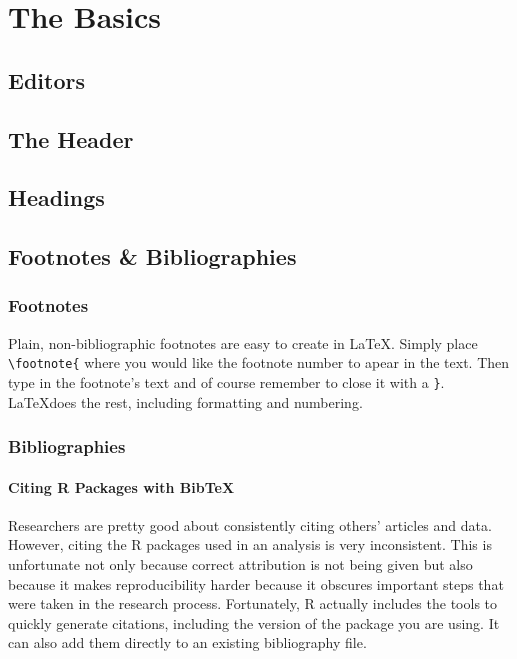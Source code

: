 \documentclass[ChapterTOCs,krantz1]{krantz}\usepackage{graphicx, color}
\begin{document}
\section{The Basics}

\subsection{Editors}

\subsection{The Header}

\subsection{Headings}

\subsection{Footnotes \& Bibliographies}

\subsubsection{Footnotes}

Plain, non-bibliographic footnotes are easy to create in \LaTeX. Simply place \texttt{\textbackslash{}footnote\{} where you would like the footnote number to apear in the text. Then type in the footnote's text and of course remember to close it with a \texttt{\}}. \LaTeX does the rest, including formatting and numbering.

\subsubsection{Bibliographies}

\paragraph{Citing R Packages with BibTeX}

Researchers are pretty good about consistently citing others' articles and data. However, citing the R packages used in an analysis is very inconsistent. This is unfortunate not only because correct attribution is not being given but also because it makes reproducibility harder because it obscures important steps that were taken in the
research process. Fortunately, R actually includes the tools to quickly generate citations, including the version of the package you are using. It can also add them directly to an existing bibliography file.
\end{document}
